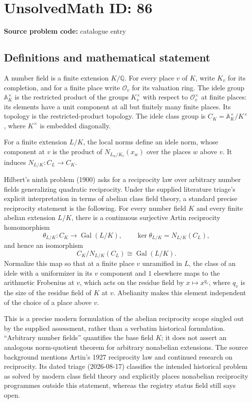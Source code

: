 \documentclass[11pt]{article}
\newcommand{\Q}{\mathbb{Q}}
\begin{document}
\section*{UnsolvedMath ID: 86}
\textbf{Source problem code:} catalogue entry
\subsection{Definitions and mathematical statement}
A number field is a finite extension $K/\Q$. For every place $v$ of $K$, write $K_v$ for its completion, and for a finite place write $\mathcal O_v$ for its valuation ring. The idele group $\mathbb A_K^{\times}$ is the restricted product of the groups $K_v^{\times}$ with respect to $\mathcal O_v^{\times}$ at finite places: its elements have a unit component at all but finitely many finite places. Its topology is the restricted-product topology. The idele class group is $C_K=\mathbb A_K^{\times}/K^{\times}$, where $K^{\times}$ is embedded diagonally.

For a finite extension $L/K$, the local norms define an idele norm, whose component at $v$ is the product of $N_{L_w/K_v}(x_w)$ over the places $w$ above $v$. It induces $N_{L/K}:C_L\to C_K$.

Hilbert's ninth problem (1900) asks for a reciprocity law over arbitrary number fields generalizing quadratic reciprocity. Under the supplied literature triage's explicit interpretation in terms of abelian class field theory, a standard precise reciprocity statement is the following. For every number field $K$ and every finite abelian extension $L/K$, there is a continuous surjective Artin reciprocity homomorphism
\[
\theta_{L/K}:C_K\longrightarrow \operatorname{Gal}(L/K),\qquad
\ker\theta_{L/K}=N_{L/K}(C_L),
\]
and hence an isomorphism
\[
C_K/N_{L/K}(C_L)\cong\operatorname{Gal}(L/K).
\]
Normalize this map so that at a finite place $v$ unramified in $L$, the class of an idele with a uniformizer in its $v$ component and $1$ elsewhere maps to the arithmetic Frobenius at $v$, which acts on the residue field by $x\mapsto x^{q_v}$, where $q_v$ is the size of the residue field of $K$ at $v$. Abelianity makes this element independent of the choice of a place above $v$.

This is a precise modern formulation of the abelian reciprocity scope singled out by the supplied assessment, rather than a verbatim historical formulation. ``Arbitrary number fields'' quantifies the base field $K$; it does not assert an analogous norm-quotient theorem for arbitrary nonabelian extensions. The source background mentions Artin's 1927 reciprocity law and continued research on reciprocity. Its dated triage (2026-08-17) classifies the intended historical problem as solved by modern class field theory and explicitly places nonabelian reciprocity programmes outside this statement, whereas the registry status field still says open.
\end{document}
